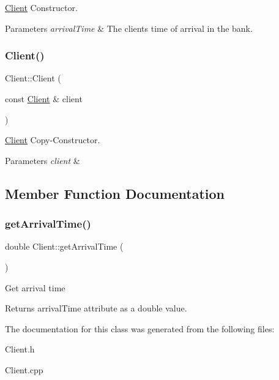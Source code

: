 \hyperlink{classClient}{Client} Constructor. 
\begin{DoxyParams}{Parameters}
{\em arrival\+Time} & The client\textquotesingle{}s time of arrival in the bank. \\
\hline
\end{DoxyParams}
\mbox{\label{classClient_ab74cbe8124ada5342d56030bd608876b}} 
\subsubsection{\texorpdfstring{Client()}{Client()}\hspace{0.1cm}{\footnotesize\ttfamily [2/2]}}
{\footnotesize\ttfamily Client\+::\+Client (\begin{DoxyParamCaption}\item[{const \hyperlink{classClient}{Client} \&}]{client }\end{DoxyParamCaption})}

\hyperlink{classClient}{Client} Copy-\/\+Constructor. 
\begin{DoxyParams}{Parameters}
{\em client} & \\
\hline
\end{DoxyParams}


\subsection{Member Function Documentation}
\mbox{\label{classClient_a748d86e8c875f10a5d92c3cf2a12e621}} 
\subsubsection{\texorpdfstring{get\+Arrival\+Time()}{getArrivalTime()}}
{\footnotesize\ttfamily double Client\+::get\+Arrival\+Time (\begin{DoxyParamCaption}{ }\end{DoxyParamCaption})}

Get arrival time \begin{DoxyReturn}{Returns}
arrival\+Time attribute as a double value. 
\end{DoxyReturn}


The documentation for this class was generated from the following files\+:\begin{DoxyCompactItemize}
\item 
Client.\+h\item 
Client.\+cpp\end{DoxyCompactItemize}
